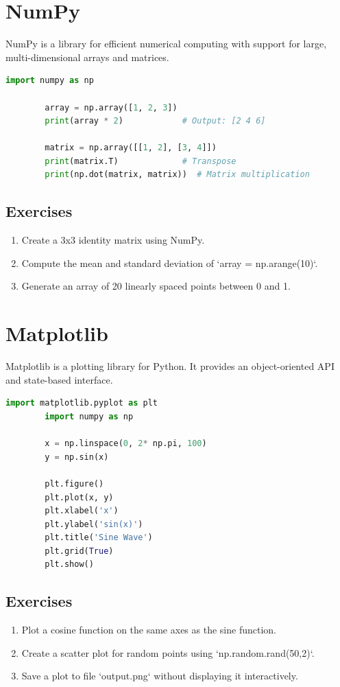 \documentclass[a4paper,11pt]{article}
\begin{document}
	\section{NumPy}
	NumPy is a library for efficient numerical computing with support for large, multi-dimensional arrays and matrices.
	
	\begin{lstlisting}[language=Python]
		import numpy as np
		
		array = np.array([1, 2, 3])
		print(array * 2)            # Output: [2 4 6]
		
		matrix = np.array([[1, 2], [3, 4]])
		print(matrix.T)             # Transpose
		print(np.dot(matrix, matrix))  # Matrix multiplication
	\end{lstlisting}
	
	\subsection*{Exercises}
	\begin{enumerate}
		\item Create a 3x3 identity matrix using NumPy.
		\item Compute the mean and standard deviation of `array = np.arange(10)`.
		\item Generate an array of 20 linearly spaced points between 0 and 1.
	\end{enumerate}
	
	\section{Matplotlib}
	Matplotlib is a plotting library for Python. It provides an object-oriented API and state-based interface.
	
	\begin{lstlisting}[language=Python]
		import matplotlib.pyplot as plt
		import numpy as np
		
		x = np.linspace(0, 2* np.pi, 100)
		y = np.sin(x)
		
		plt.figure()
		plt.plot(x, y)
		plt.xlabel('x')
		plt.ylabel('sin(x)')
		plt.title('Sine Wave')
		plt.grid(True)
		plt.show()
	\end{lstlisting}
	
	\subsection*{Exercises}
	\begin{enumerate}
		\item Plot a cosine function on the same axes as the sine function.
		\item Create a scatter plot for random points using `np.random.rand(50,2)`.  
		\item Save a plot to file `output.png` without displaying it interactively.
	\end{enumerate}
	
\end{document}
